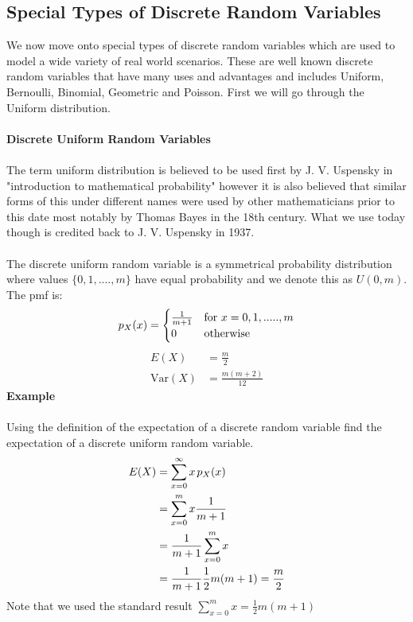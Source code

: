 \documentclass[,oneside]{article}
\begin{document}
\begin{enumerate}
\subsection{Special Types of Discrete Random Variables}
We now move onto special types of discrete random variables which are used to model a wide variety of real world scenarios. These are well known discrete random variables that have many uses and advantages and includes Uniform, Bernoulli, Binomial, Geometric and Poisson. First we will go through the Uniform distribution.\\ \\
\textbf{Discrete Uniform Random Variables}\\ \\
The term uniform distribution is believed to be used first by J. V. Uspensky in "introduction to mathematical probability" however it is also believed that similar forms of this under different names were used by other mathematicians prior to this date most notably by Thomas Bayes in the 18th century. What we use today though is credited back to J. V. Uspensky in 1937.\\ \\
The discrete uniform random variable is a symmetrical probability distribution where values $\{0,1,....,m\}$ have equal probability and we denote this as $U(0,m)$. The pmf is:\\ 
\[
p_X(x) =
\begin{cases}
\frac{1}{m+1} & \text{for }  x = 0,1,.....,m \\
0 & $otherwise$
\end{cases} \] 
\begin{align*}
E(X)&=\frac{m}{2}\\
\text{Var}(X)&=\frac{m(m+2)}{12}
\end{align*}
\textbf{Example}\\ \\
Using the definition of the expectation of a discrete random variable find the expectation of a discrete uniform random variable.\\ 
\begin{align*}
E(X)&=\sum\limits_{x=0}^{\infty}x\hspace{0.05cm} p_X(x)\\
&= \sum\limits_{x=0}^{m}x \frac{1}{m+1}\\
&= \frac{1}{m+1}\sum\limits_{x=0}^{m} x\\
&= \frac{1}{m+1} \frac{1}{2}m(m+1) = \frac{m}{2}
\end{align*} 
Note that we used the standard result $\sum\limits_{x=0}^{m} x = \frac{1}{2}m(m+1)$\\ \\

\end{enumerate}
\end{document}
